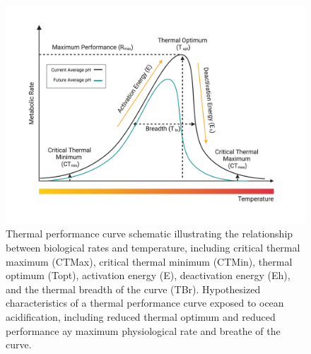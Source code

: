 \documentclass[
  12pt,
]{article}
\begin{document}
\begin{figure}[htbp]
    \centering
    \includegraphics[width=1\textwidth]{Images/thermal_performance_curve_schematic.png}
    \caption{Thermal performance curve schematic illustrating the relationship between biological rates and temperature, including critical thermal maximum (CTMax), critical thermal minimum (CTMin), thermal optimum (Topt), activation energy (E), deactivation energy (Eh), and the thermal breadth of the curve (TBr). Hypothesized characteristics of a thermal performance curve exposed to ocean acidification, including reduced thermal optimum and reduced performance ay maximum physiological rate and breathe of the curve.}
    \label{fig:Thermal Performance Curve Schematic}
\end{figure}
\end{document}
